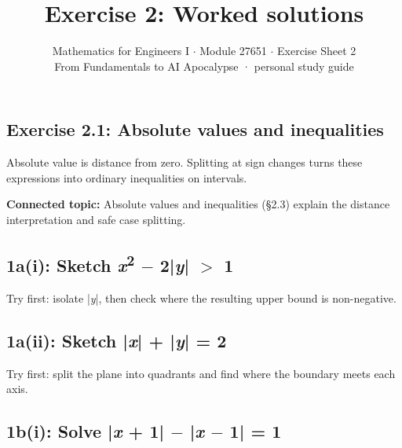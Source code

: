 \documentclass[11pt]{article}
\title{\sffamily\bfseries\color{FAUblue}Exercise 2: Worked solutions}
\author{Mathematics for Engineers I \ensuremath{\cdot} Module 27651 \ensuremath{\cdot} Exercise Sheet 2\\[2pt]\small From Fundamentals to AI Apocalypse · personal study guide}
\date{}
\begin{document}
\maketitle
\begingroup\footnotesize\setlength{\parskip}{0pt}\tableofcontents\endgroup
\clearpage

\begin{keepsection}
\section{Exercise 2.1: Absolute values and inequalities}

Absolute value is distance from zero. Splitting at sign changes turns these expressions into ordinary inequalities on intervals.

\textbf{Connected topic:} Absolute values and inequalities (§2.3) explain the distance interpretation and safe case splitting.

\begin{keepsection}
\subsection{1a(i): Sketch \textit{x}\textsuperscript{2} \ensuremath{-} 2|\textit{y}| \ensuremath{>} 1}

Try first: isolate |\textit{y}|, then check where the resulting upper bound is non-negative.

\end{keepsection}

\begin{keepsection}
\subsection{1a(ii): Sketch |\textit{x}| + |\textit{y}| = 2}

Try first: split the plane into quadrants and find where the boundary meets each axis.

\end{keepsection}

\begin{keepsection}
\subsection{1b(i): Solve |\textit{x} + 1| \ensuremath{-} |\textit{x} \ensuremath{-} 1| = 1}


\end{keepsection}
\end{keepsection}
\end{document}
